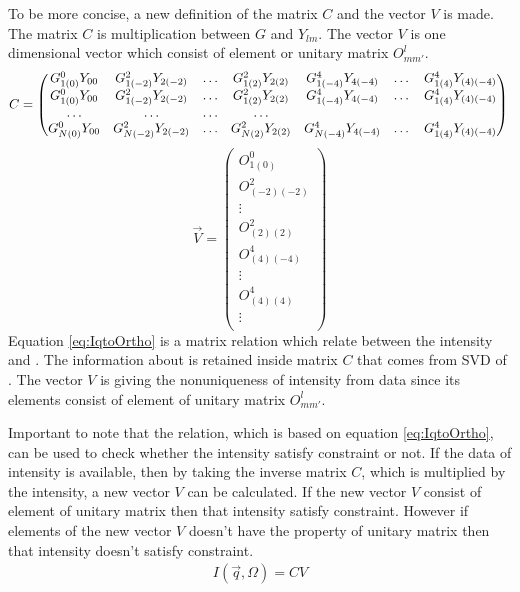 To be more concise, a new definition of the matrix $C$ and the vector $V$ is made. The matrix $C$ is multiplication between $G$ and $Y_{lm}$. The vector $V$ is one dimensional vector which consist of element or unitary matrix $O^{l}_{mm'}$. 
\begin{equation}
\label{eq:Cmatrix}
C=
\begin{pmatrix}
G^{0}_{1(0)} Y_{00} & G^{2}_{1(-2)} Y_{2(-2)} & \ldots & G^{2}_{1(2)} Y_{2(2)} & G^{4}_{1(-4)} Y_{4(-4)} & \dots  & G^{4}_{1(4)}Y_{(4)(-4)} \\
G^{0}_{1(0)} Y_{00} & G^{2}_{1(-2)} Y_{2(-2)} & \ldots & G^{2}_{1(2)} Y_{2(2)} & G^{4}_{1(-4)} Y_{4(-4)} & \dots  & G^{4}_{1(4)}Y_{(4)(-4)} \\
\ldots & \ldots & \ldots & \ldots & \\
G^{0}_{N(0)} Y_{00} & G^{2}_{N(-2)} Y_{2(-2)} & \ldots & G^{2}_{N(2)} Y_{2(2)} & G^{4}_{N(-4)} Y_{4(-4)} & \dots  & G^{4}_{1(4)}Y_{(4)(-4)} \\
\end{pmatrix} \\
\end{equation}
\begin{equation}
\label{eq:Vvector}
\vec{V}=
\begin{pmatrix}
O^{0}_{1(0)} \\
O^{2}_{(-2)(-2)} \\
\vdots \\
O^{2}_{(2)(2)} \\
O^{4}_{(4)(-4)} \\
\vdots \\
O^{4}_{(4)(4)} \\
\vdots \\
\end{pmatrix}
\end{equation}
Equation \ref{eq:IqtoOrtho} is a matrix relation which relate between the intensity and \Blq. The information about \Blq is retained inside matrix $C$ that comes from SVD of \Blq. The vector $V$ is giving the nonuniqueness of intensity from \Blq data since its elements consist of element of unitary matrix $O^{l}_{mm'}$. 

Important to note that the relation, which is based on equation \ref{eq:IqtoOrtho}, can be used to check whether the intensity satisfy \Blq constraint or not. If the data of intensity is available, then by taking the inverse matrix $C$, which is multiplied by the intensity, a new vector $V$ can be calculated. If the new vector $V$ consist of element of unitary matrix then that intensity satisfy \Blq constraint. However if elements of the new vector $V$ doesn't have the property of unitary matrix then that intensity doesn't satisfy \Blq constraint. 
\begin{eqnarray}
\label{eq:IqtoOrtho}
I(\vec{q},\Omega) = C V 
\end{eqnarray}

